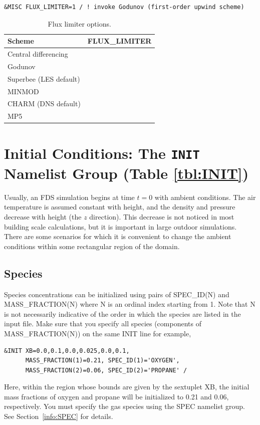 \documentclass[11pt]{book}
\begin{document}
\begin{lstlisting}
&MISC FLUX_LIMITER=1 / ! invoke Godunov (first-order upwind scheme)
\end{lstlisting}

\begin{table}[ht]
\caption[Flux limiter options]{Flux limiter options.}
\label{tab:flux_limiters}
\centering
\begin{tabular}{|lc|}
\hline
Scheme                 & {\ct FLUX\_LIMITER} \\
\hline
Central differencing   & {\ct 0}  \\
Godunov                & {\ct 1}  \\
Superbee (LES default) & {\ct 2}  \\
MINMOD                 & {\ct 3}  \\
CHARM (DNS default)    & {\ct 4}  \\
MP5                    & {\ct 5}  \\ \hline
\end{tabular}
\end{table}


\clearpage


\section{Initial Conditions: The \texorpdfstring{{\tt INIT}}{INIT} Namelist Group (Table \ref{tbl:INIT})}
\label{info:INIT}

Usually, an FDS simulation begins at time $t=0$ with ambient conditions. The air temperature is
assumed constant with height, and the density and pressure decrease with height (the $z$ direction). This
decrease is not noticed in most building scale calculations, but it is important in large outdoor
simulations. There are some scenarios for which it is convenient to change the ambient conditions within some
rectangular region of the domain.

\subsection*{Species}

Species concentrations can be initialized using pairs of {\ct SPEC\_ID(N)} and {\ct MASS\_FRACTION(N)} where {\ct N} is an ordinal index starting from 1. Note that {\ct N} is not necessarily indicative of the order in which the species are listed in the input file.
Make sure that you specify all species (components of {\ct MASS\_FRACTION(N)}) on the same {\ct INIT} line for example,
\begin{lstlisting}
&INIT XB=0.0,0.1,0.0,0.025,0.0,0.1,
      MASS_FRACTION(1)=0.21, SPEC_ID(1)='OXYGEN',
      MASS_FRACTION(2)=0.06, SPEC_ID(2)='PROPANE' /
\end{lstlisting}
Here, within the region whose bounds are given by the sextuplet {\ct XB}, the initial mass fractions of oxygen and propane will be initialized to 0.21 and 0.06, respectively. You must specify the gas species using the {\ct SPEC} namelist group. See Section~\ref{info:SPEC} for details.
\end{document}
